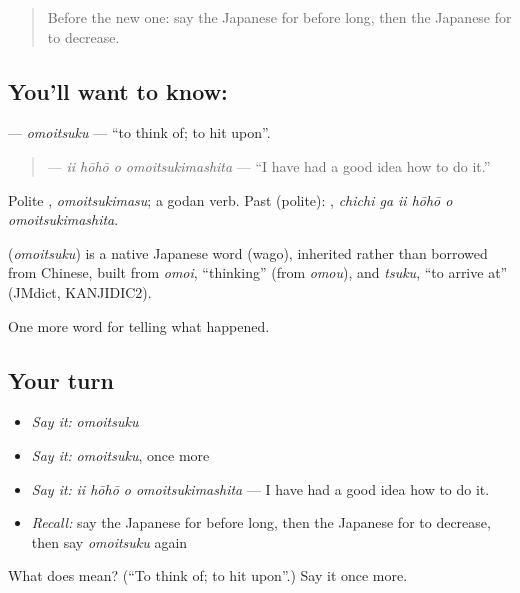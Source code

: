 \label{lesson:JA-C314-omoitsuku}



\begin{quote}
Before the new one: say the Japanese for before long, then the Japanese for to decrease.
\end{quote}

\subsection*{You'll want to know: }
\textbf{} — \emph{omoitsuku} — \textquotedblleft{}to think of; to hit upon\textquotedblright{}.

\begin{quote}
\textbf{  } — \emph{ii hōhō o omoitsukimashita} — \textquotedblleft{}I have had a good idea how to do it.\textquotedblright{}
\end{quote}

Polite \textbf{}, \emph{omoitsukimasu}; a godan verb. Past (polite): \textbf{   }, \emph{chichi ga ii hōhō o omoitsukimashita}.

\begin{cousinweb}
\textbf{} (\emph{omoitsuku}) is a native Japanese word (wago), inherited rather than borrowed from Chinese, built from \emph{omoi}, \textquotedblleft{}thinking\textquotedblright{} (from \emph{omou}), and \emph{tsuku}, \textquotedblleft{}to arrive at\textquotedblright{} (JMdict, KANJIDIC2).
\end{cousinweb}

\begin{grammarlens}[title={What you've built}]
One more word for telling what happened.
\end{grammarlens}

\subsection*{Your turn}
\begin{itemize}
\raggedright
  \item \emph{Say it:} \emph{omoitsuku}
  \item \emph{Say it:} \emph{omoitsuku}, once more
  \item \emph{Say it:} \emph{ii hōhō o omoitsukimashita} — I have had a good idea how to do it.
  \item \emph{Recall:} say the Japanese for before long, then the Japanese for to decrease, then say \emph{omoitsuku} again
\end{itemize}

\begin{tcolorbox}[breakable,colback=teal!4,colframe=teal!35!black,title={Before you move on}]
What does  mean? (\textquotedblleft{}To think of; to hit upon\textquotedblright{}.) Say it once more.
\end{tcolorbox}
